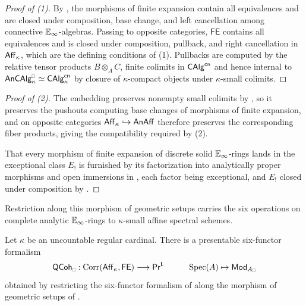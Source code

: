 \begin{proof}[Proof of (1)]
    By , the morphisms of finite expansion contain all equivalences and are closed under composition, base change, and left cancellation among connective $\mathbb{E}_{\infty}$-algebras. Passing to opposite categories, $\mathsf{FE}$ contains all equivalences and is closed under composition, pullback, and right cancellation in $\mathsf{Aff}_{\kappa}$, which are the defining conditions of  (1). Pullbacks are computed by the relative tensor products $B\otimes_{A}C$, finite colimits in $\mathsf{CAlg}^{\mathsf{cn}}$ and hence internal to $\An\CAlg^{\sld}_{\kappa}\simeq\CAlg^{\cn}_{\kappa}$ by closure of $\kappa$-compact objects under $\kappa$-small colimits.
\end{proof}
\begin{proof}[Proof of (2)]
    The embedding preserves nonempty small colimits by , so it preserves the pushouts computing base changes of morphisms of finite expansion, and on opposite categories $\mathsf{Aff}_{\kappa}\hookrightarrow\mathsf{An}\mathsf{Aff}$ therefore preserves the corresponding fiber products, giving the compatibility required by  (2).
    
    That every morphism of finite expansion of discrete solid $\mathbb{E}_{\infty}$-rings lands in the exceptional class $E_{!}$ is furnished by its factorization into analytically proper morphisms and open immersions in , each factor being exceptional, and $E_{!}$ closed under composition by .
\end{proof}
Restriction along this morphism of geometric setups carries the six operations on complete analytic $\mathbb{E}_{\infty}$-rings to $\kappa$-small affine spectral schemes.
\begin{proposition}\label{prop: six-functor formalism affine spectral schemes}
    Let $\kappa$ be an uncountable regular cardinal. There is a presentable six-functor formalism
    $$\QCoh_{\sld}:\Corr(\Aff_{\kappa},\mathsf{FE})\longrightarrow\PrL \hspace{1cm} \spec(A)\mapsto\Mod_{A_{\sld}}$$
    obtained by restricting the six-functor formalism of  along the morphism of geometric setups of .
\end{proposition}
